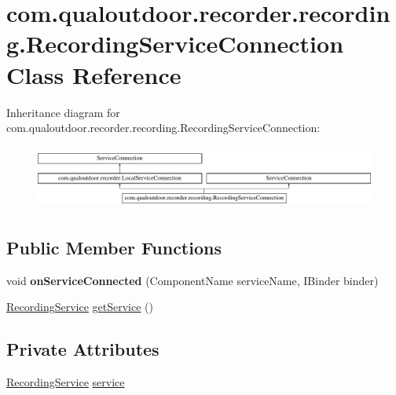 \hypertarget{classcom_1_1qualoutdoor_1_1recorder_1_1recording_1_1RecordingServiceConnection}{\section{com.\-qualoutdoor.\-recorder.\-recording.\-Recording\-Service\-Connection Class Reference}
\label{classcom_1_1qualoutdoor_1_1recorder_1_1recording_1_1RecordingServiceConnection}
}
Inheritance diagram for com.\-qualoutdoor.\-recorder.\-recording.\-Recording\-Service\-Connection\-:\begin{figure}[H]
\begin{center}
\leavevmode
\includegraphics[height=2.121212cm]{classcom_1_1qualoutdoor_1_1recorder_1_1recording_1_1RecordingServiceConnection}
\end{center}
\end{figure}
\subsection*{Public Member Functions}
\begin{DoxyCompactItemize}
\item 
\hypertarget{classcom_1_1qualoutdoor_1_1recorder_1_1recording_1_1RecordingServiceConnection_a150438c50b77f52c96951846a65f0748}{void {\bfseries on\-Service\-Connected} (Component\-Name service\-Name, I\-Binder binder)}\label{classcom_1_1qualoutdoor_1_1recorder_1_1recording_1_1RecordingServiceConnection_a150438c50b77f52c96951846a65f0748}

\item 
\hyperlink{classcom_1_1qualoutdoor_1_1recorder_1_1recording_1_1RecordingService}{Recording\-Service} \hyperlink{classcom_1_1qualoutdoor_1_1recorder_1_1recording_1_1RecordingServiceConnection_a10e61e4e5c92174b21264df6c3a1247b}{get\-Service} ()
\end{DoxyCompactItemize}
\subsection*{Private Attributes}
\begin{DoxyCompactItemize}
\item 
\hyperlink{classcom_1_1qualoutdoor_1_1recorder_1_1recording_1_1RecordingService}{Recording\-Service} \hyperlink{classcom_1_1qualoutdoor_1_1recorder_1_1recording_1_1RecordingServiceConnection_a8eb8ebee30e9b3f9264935bc7277ae5e}{service}
\end{DoxyCompactItemize}
